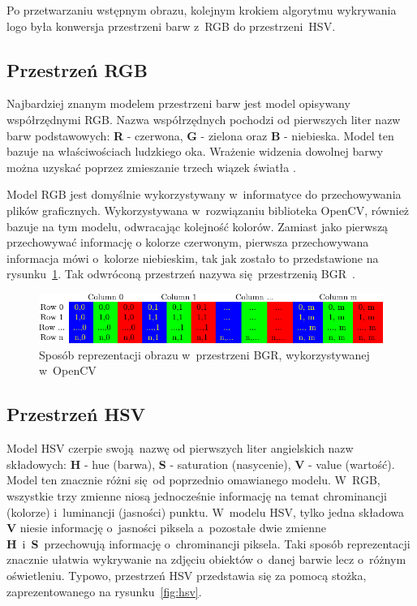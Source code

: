 Po przetwarzaniu wstępnym obrazu, kolejnym krokiem algorytmu wykrywania logo \bk była konwersja przestrzeni barw z~RGB do przestrzeni~HSV.

\subsection{Przestrzeń RGB}
Najbardziej znanym modelem przestrzeni barw jest model opisywany współrzędnymi RGB. Nazwa współrzędnych pochodzi od pierwszych liter nazw barw podstawowych: \textbf{R} - czerwona, \textbf{G} - zielona oraz \textbf{B} - niebieska. Model ten bazuje na właściwościach ludzkiego oka. Wrażenie widzenia dowolnej barwy można uzyskać poprzez zmieszanie trzech wiązek światła \cite{jankowski1990elementy}.

Model RGB jest domyślnie wykorzystywany w~informatyce do przechowywania plików graficznych. Wykorzystywana w~rozwiązaniu biblioteka OpenCV, również bazuje na tym modelu, odwracając kolejność kolorów. Zamiast jako pierwszą przechowywać informację o kolorze czerwonym, pierwsza przechowywana informacja mówi o~kolorze niebieskim, tak jak zostało to przedstawione na rysunku~\ref{fig:bgr}. Tak odwróconą przestrzeń nazywa się przestrzenią BGR~\cite{opencv}.

\begin{figure}[h]
    \centering
    \includegraphics[width=\columnwidth]{./figures/opencv-matrix-bgr.png}
    \caption{Sposób reprezentacji obrazu w~przestrzeni BGR, wykorzystywanej w~OpenCV~\cite{opencv}}
    \label{fig:bgr}
\end{figure}

\subsection{Przestrzeń HSV}
Model HSV czerpie swoją nazwę od pierwszych liter angielskich nazw składowych: \textbf{H} - hue (barwa), \textbf{S} - saturation (nasycenie), \textbf{V} - value (wartość). Model ten znacznie różni się od poprzednio omawianego modelu. W~RGB, wszystkie trzy zmienne niosą jednocześnie informację na temat chrominancji (kolorze) i~luminancji (jasności) punktu. W~modelu HSV, tylko jedna składowa \textbf{V} niesie informację o~jasności piksela a~pozostałe dwie zmienne \textbf{H}~i~\textbf{S}~przechowują informację o~chrominancji piksela. Taki sposób reprezentacji znacznie ułatwia wykrywanie na zdjęciu obiektów o~danej barwie lecz o~różnym oświetleniu. Typowo, przestrzeń HSV przedstawia się za pomocą stożka, zaprezentowanego na rysunku~\ref{fig:hsv}.

